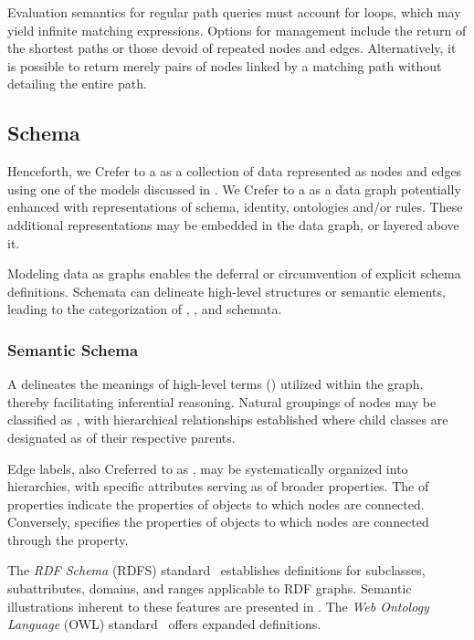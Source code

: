 Evaluation semantics for regular path queries must account for loops, which may yield infinite matching expressions. Options for management include the return of the shortest paths or those devoid of repeated nodes and edges. Alternatively, it is possible to return merely pairs of nodes linked by a matching path without detailing the entire path.

\subsection{Schema}\label{schema-identity-context}
Henceforth, we Crefer to a  as a collection of data represented as nodes and edges using one of the models discussed in . We Crefer to a  as a data graph potentially enhanced with representations of schema, identity, ontologies and/or rules. These additional representations may be embedded in the data graph, or layered above it.

Modeling data as graphs enables the deferral or circumvention of explicit schema definitions. Schemata can delineate high-level structures or semantic elements, leading to the categorization of , , and  schemata.

\subsubsection{Semantic Schema}\label{schema_semantic}
A  delineates the meanings of high-level terms () utilized within the graph, thereby facilitating inferential reasoning. Natural groupings of nodes may be classified as , with hierarchical relationships established where child classes are designated as  of their respective parents.

Edge labels, also Creferred to as , may be systematically organized into hierarchies, with specific attributes serving as  of broader properties. The  of properties indicate the properties of objects to which nodes are connected. Conversely,  specifies the properties of objects to which nodes are connected through the property.

The \textit{RDF Schema} (RDFS) standard~\cite{Brickley2014RDFSchema1.1} establishes definitions for subclasses, subattributes, domains, and ranges applicable to RDF graphs. Semantic illustrations inherent to these features are presented in . The \textit{Web Ontology Language} (OWL) standard~\cite{Hitzler2014OWLPrimer} offers expanded definitions.

